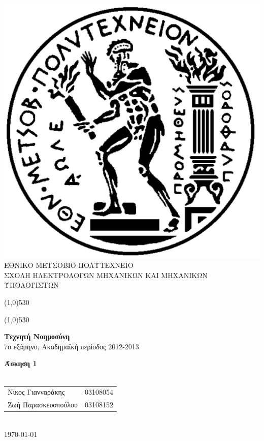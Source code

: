 \documentclass[12pt]{article}
\begin{document}
\begin{titlepage}
\begin{center}

\includegraphics[scale=0.15]{pyrforos.pdf}\\
ΕΘΝΙΚΟ ΜΕΤΣΟΒΙΟ ΠΟΛΥΤΕΧΝΕΙΟ \\
ΣΧΟΛΗ ΗΛΕΚΤΡΟΛΟΓΩΝ ΜΗΧΑΝΙΚΩΝ KΑΙ ΜΗΧΑΝΙΚΩΝ ΥΠΟΛΟΓΙΣΤΩΝ \\ 
\vspace{0.5em}

\medskip 

\def\doubleline{

    \vspace{0.1em}
    \line(1,0){530}\

    \vspace{-1.5em}
    \line(1,0){530}

}
\doubleline
\vspace{1.3em}

{\large \textbf{Τεχνητή Νοημοσύνη}\\
 \medskip
7ο εξάμηνο, Ακαδημαϊκή περίοδος 2012-2013 \\ \bigskip \medskip}

\vspace{1.5em}
{\LARGE \textbf{Άσκηση 1\\}}
\vspace{8em}
\haskelllogo[rounded corners=2pt, scale = 2] \\
\vfill
\begin{tabular}{l l}
Νίκος Γιανναράκης & 03108054 \\
Ζωή Παρασκευοπούλου & 03108152 \\
\end{tabular}\\
\bigskip
\today
\end{center}
\end{titlepage}
\tableofcontents
\end{document}
